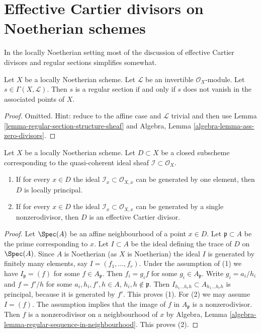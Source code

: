 \section{Effective Cartier divisors on Noetherian schemes}
\label{section-Noetherian-effective-Cartier}

\noindent
In the locally Noetherian setting most of the discussion of
effective Cartier divisors and regular sections simplifies somewhat.

\begin{lemma}
\label{lemma-regular-section-associated-points}
Let $X$ be a locally Noetherian scheme. Let $\mathcal{L}$ be an invertible
$\mathcal{O}_X$-module. Let $s \in \Gamma(X, \mathcal{L})$. Then $s$
is a regular section if and only if $s$ does not vanish in the associated
points of $X$.
\end{lemma}

\begin{proof}
Omitted. Hint: reduce to the affine case and $\mathcal{L}$ trivial
and then use Lemma \ref{lemma-regular-section-structure-sheaf} and
Algebra, Lemma \ref{algebra-lemma-ass-zero-divisors}.
\end{proof}

\begin{lemma}
\label{lemma-effective-Cartier-in-points}
Let $X$ be a locally Noetherian scheme. Let $D \subset X$ be a closed subscheme
corresponding to the quasi-coherent ideal sheaf
$\mathcal{I} \subset \mathcal{O}_X$.
\begin{enumerate}
\item If for every $x \in D$ the ideal
$\mathcal{I}_x \subset \mathcal{O}_{X, x}$
can be generated by one element, then $D$ is locally principal.
\item If for every $x \in D$ the ideal
$\mathcal{I}_x \subset \mathcal{O}_{X, x}$
can be generated by a single nonzerodivisor, then $D$ is an
effective Cartier divisor.
\end{enumerate}
\end{lemma}

\begin{proof}
Let $\Spec(A)$ be an affine neighbourhood of a point $x \in D$.
Let $\mathfrak p \subset A$ be the prime corresponding to $x$.
Let $I \subset A$ be the ideal defining the trace of $D$ on
$\Spec(A)$. Since $A$ is Noetherian (as $X$ is Noetherian)
the ideal $I$ is generated by finitely many elements, say
$I = (f_1, \ldots, f_r)$. Under the assumption of (1) we have
$I_\mathfrak p = (f)$ for some $f \in A_\mathfrak p$.
Then $f_i = g_i f$ for some $g_i \in A_\mathfrak p$.
Write $g_i = a_i/h_i$ and $f = f'/h$ for some
$a_i, h_i, f', h \in A$, $h_i, h \not \in \mathfrak p$.
Then $I_{h_1 \ldots h_r h} \subset A_{h_1 \ldots h_r h}$ is
principal, because it is generated by $f'$. This proves (1).
For (2) we may assume $I = (f)$. The assumption implies
that the image of $f$ in $A_\mathfrak p$ is a nonzerodivisor.
Then $f$ is a nonzerodivisor on a neighbourhood of $x$ by
Algebra, Lemma \ref{algebra-lemma-regular-sequence-in-neighbourhood}.
This proves (2).
\end{proof}

